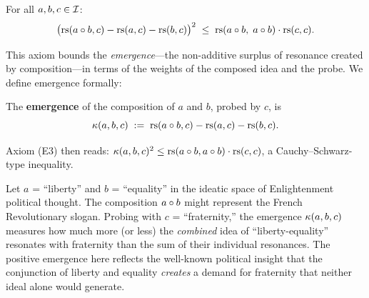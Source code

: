 \begin{axiom_def}
For all $a, b, c \in \mathcal{I}$:
\[
    \bigl(\mathrm{rs}(a \circ b, c) - \mathrm{rs}(a, c) - \mathrm{rs}(b, c)\bigr)^2
    \;\leq\;
    \mathrm{rs}(a \circ b,\; a \circ b) \cdot \mathrm{rs}(c, c).
\]
\end{axiom_def}

This axiom bounds the \emph{emergence}---the non-additive surplus of
resonance created by composition---in terms of the weights of the
composed idea and the probe. We define emergence formally:

\begin{definition}[Emergence]\label{def:emergence}
The \textbf{emergence} of the composition of $a$ and $b$, probed by $c$,
is
\[
    \kappa(a, b, c) \;:=\; \mathrm{rs}(a \circ b, c) - \mathrm{rs}(a, c) - \mathrm{rs}(b, c).
\]
\end{definition}

Axiom (E3) then reads: $\kappa(a,b,c)^2 \leq \mathrm{rs}(a\circ b, a\circ b)
\cdot \mathrm{rs}(c,c)$, a Cauchy--Schwarz-type inequality.

\begin{example}
Let $a$ = ``liberty'' and $b$ = ``equality'' in the ideatic space of
Enlightenment political thought. The composition $a \circ b$ might
represent the French Revolutionary slogan. Probing with $c$ =
``fraternity,'' the emergence $\kappa(a,b,c)$ measures how much more
(or less) the \emph{combined} idea of ``liberty-equality'' resonates with
fraternity than the sum of their individual resonances. The positive
emergence here reflects the well-known political insight that the
conjunction of liberty and equality \emph{creates} a demand for
fraternity that neither ideal alone would generate.
\end{example}

